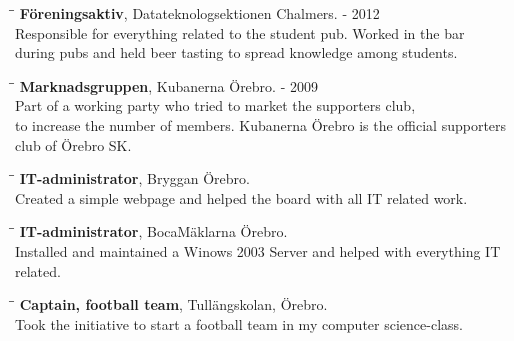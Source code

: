 \documentclass[11pt]{res}
\begin{document}
\begin{resume}
	\begin{tabbing}
		\hspace{2.3in}\= \hspace{2.6in}\= \kill %
		{\bf  Föreningsaktiv}, Datateknologsektionen Chalmers. \>  - 2012\\
		Responsible for everything related to the student pub. Worked in the bar \\ during pubs and held beer tasting to spread knowledge among students.
	\end{tabbing}
\vspace{-30pt}


	\begin{tabbing}
		\hspace{2.3in}\= \hspace{2.6in}\= \kill %
		{\bf  Marknadsgruppen}, Kubanerna Örebro. \>  - 2009\\
		Part of a working party who tried to market the supporters club, \\ to increase the number of members. Kubanerna Örebro is the official supporters club of Örebro SK.
	\end{tabbing}

\vspace{-30pt}

	\begin{tabbing}
		\hspace{2.3in}\= \hspace{2.6in}\= \kill %
		{\bf  IT-administrator}, Bryggan Örebro. \> \>	2009\\
		Created a simple webpage and helped the board with all IT related work.
	\end{tabbing}

\vspace{-30pt}

	\begin{tabbing}
		\hspace{2.3in}\= \hspace{2.6in}\= \kill %
		{\bf  IT-administrator}, BocaMäklarna Örebro. \> \\
		Installed and maintained a Winows 2003 Server and helped with everything IT related.
	\end{tabbing}

\vspace{-30pt}

	\begin{tabbing}
		\hspace{2.3in}\= \hspace{2.6in}\= \kill %
		{\bf  Captain, football team}, Tullängskolan, Örebro. \> \>	2009\\
		Took the initiative to start a football team in my computer science-class. 
	\end{tabbing}


\end{resume}
\end{document}
